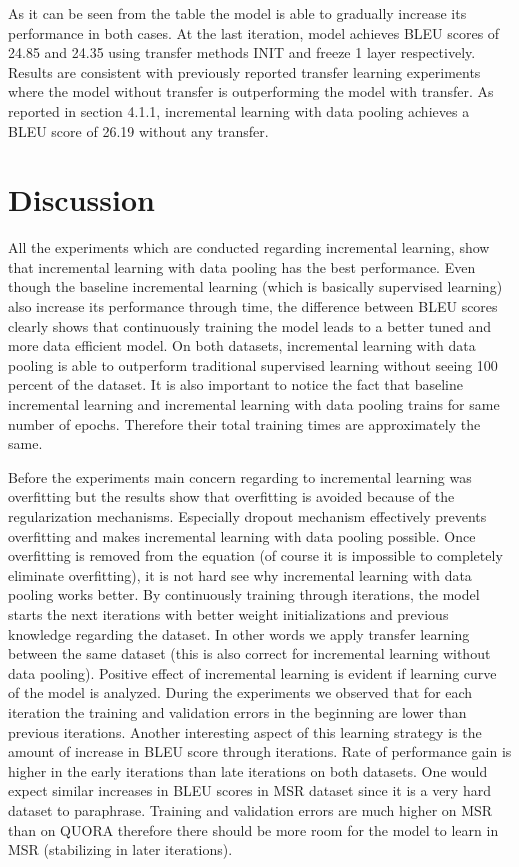 As it can be seen from the table the model is able to gradually increase its performance in both cases. At the last iteration, model achieves BLEU scores of 24.85 and 24.35 using transfer methods INIT and freeze 1 layer respectively. Results are consistent with previously reported transfer learning experiments where the model without transfer is outperforming the model with transfer. As reported in section 4.1.1, incremental learning with data pooling achieves a BLEU score of 26.19 without any transfer.  

\section{Discussion}

All the experiments which are conducted regarding incremental learning, show that incremental learning with data pooling has the best performance. Even though the baseline incremental learning (which is basically supervised learning) also increase its performance through time, the difference between BLEU scores clearly shows that continuously training the model leads to a better tuned and more data efficient model. On both datasets, incremental learning with data pooling is able to outperform traditional supervised learning without seeing 100 percent of the dataset. It is also important to notice the fact that baseline incremental learning and incremental learning with data pooling trains for same number of epochs. Therefore their total training times are approximately the same. 

Before the experiments main concern regarding to incremental learning was overfitting but the results show that overfitting is avoided because of the regularization mechanisms. Especially dropout mechanism effectively prevents overfitting and makes incremental learning with data pooling possible. Once overfitting is removed from the equation (of course it is impossible to completely eliminate overfitting), it is not hard see why incremental learning with data pooling works better. By continuously training through iterations, the model starts the next iterations with better weight initializations and previous knowledge regarding the dataset. In other words we apply transfer learning between the same dataset (this is also correct for incremental learning without data pooling). Positive effect of incremental learning is evident if learning curve of the model is analyzed. During the experiments we observed that for each iteration the training and validation errors in the beginning are lower than previous iterations. Another interesting aspect of this learning strategy is the amount of increase in BLEU score through iterations. Rate of performance gain is higher in the early iterations than late iterations on both datasets. One would expect similar increases in BLEU scores in MSR dataset since it is a very hard dataset to paraphrase. Training and validation errors are much higher on MSR than on QUORA therefore there should be more room for the model to learn in MSR (stabilizing in later iterations).

